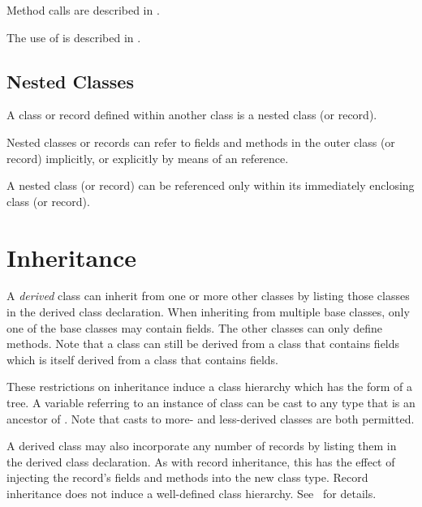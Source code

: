 Method calls are described in .

The use of  is described in .

\subsection{Nested Classes}
\label{Nested_Classes}

A class or record defined within another class is a nested class (or record).

Nested classes or records can refer to fields and methods in the outer class (or
record) implicitly, or explicitly by means of an  reference.

A nested class (or record) can be referenced only within
its immediately enclosing class (or record).

\section{Inheritance}
\label{Inheritance}

A \emph{derived} class can inherit from one or more other classes by
listing those classes in the derived class declaration.
When inheriting from multiple base classes, only one of the base classes
may contain fields.  The other classes can only define methods.  Note
that a class can still be derived from a class that contains fields
which is itself derived from a class that contains fields.  

These restrictions on inheritance induce a class hierarchy which has the form of
a tree.  A variable referring to an instance of class  can be
cast to any type that is an ancestor of .  Note that casts to more- and
less-derived classes are both permitted.

\begin{future}
A derived class may also incorporate any number of records by listing them
in the derived class declaration.
As with record inheritance, this has the effect of injecting the record's fields and
methods into the new class type.  Record inheritance does not induce a
well-defined class hierarchy.  See~ for details.
\end{future}

